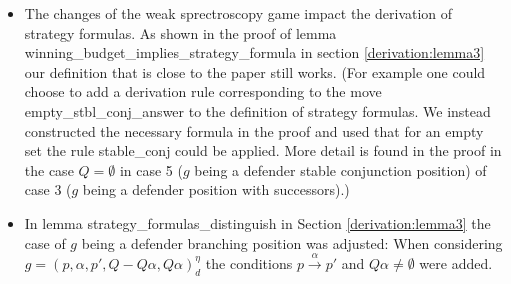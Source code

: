 \begin{itemize}
\item The changes of the weak sprectroscopy game impact the derivation of strategy formulas. As shown in the proof 
of lemma winning\_budget\_implies\_strategy\_formula in section \ref{derivation:lemma3} our definition that is close 
to the paper still works. (For example one could choose to add a derivation rule corresponding to the move empty\_stbl\_conj\_answer to the definition 
of strategy formulas. We instead constructed the necessary formula in the proof and used that for an empty set the rule stable\_conj could be applied.
More detail is found in the proof in the case $Q=\emptyset$ in case 5 ($g$ being a defender stable conjunction position) 
of case 3 ($g$ being a defender position with successors).)
\item In lemma strategy\_formulas\_distinguish in Section \ref{derivation:lemma3} the case of $g$ being a defender branching position was adjusted: 
When considering $g=(p,\alpha ,p', Q- Q \alpha, Q \alpha)_d^\eta$ the conditions $p \overset{\alpha}{\longrightarrow} p'$ and $Q \alpha \neq \emptyset$ were 
added. 
\end{itemize}